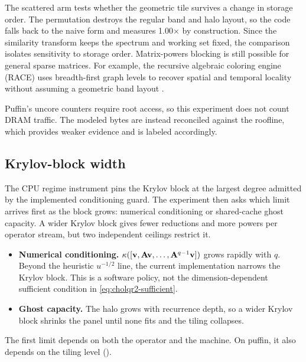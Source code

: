 The scattered arm tests whether the geometric tile survives a change in storage order. The permutation destroys the regular band and halo layout, so the code falls back to the naive form and measures 1.00$\times$ by construction. Since the similarity transform keeps the spectrum and working set fixed, the comparison isolates sensitivity to storage order. Matrix-powers blocking is still possible for general sparse matrices. For example, the recursive algebraic coloring engine (RACE) uses breadth-first graph levels to recover spatial and temporal locality without assuming a geometric band layout \cite{alappat-2022}.

Puffin's uncore counters require root access, so this experiment does not count DRAM traffic. The modeled bytes are instead reconciled against the roofline, which provides weaker evidence and is labeled accordingly.

\subsection{Krylov-block width}\label{sec:swidth}

The CPU regime instrument pins the Krylov block at the largest degree admitted by the implemented conditioning guard. The experiment then asks which limit arrives first as the block grows: numerical conditioning or shared-cache ghost capacity. A wider Krylov block gives fewer reductions and more powers per operator stream, but two independent ceilings restrict it.
\begin{itemize}
\item \textbf{Numerical conditioning.} $\kappa([\mathbf{v},\mathbf{A}\mathbf{v},\ldots,\mathbf{A}^{q-1}\mathbf{v}])$ grows rapidly with $q$. Beyond the heuristic $u^{-1/2}$ line, the current implementation narrows the Krylov block. This is a software policy, not the dimension-dependent sufficient condition in \eqref{eq:cholqr2-sufficient}.

\item \textbf{Ghost capacity.} The halo grows with recurrence depth, so a wider Krylov block shrinks the panel until none fits and the tiling collapses.
\end{itemize}

The first limit depends on both the operator and the machine. On puffin, it also depends on the tiling level ().

